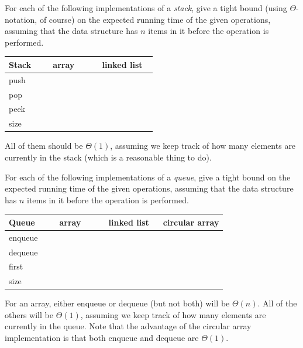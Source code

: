 \begin{exer}
For each of the following implementations of a {\em stack}, 
give a tight bound (using $\Theta$-notation, of course) 
on the expected running time of the given operations, 
assuming that the data structure has $n$ items in it before the operation is performed.

\noindent
{\LARGE
\begin{tabular}{|l|l|l|}
\hline
{\bf Stack}&\, \, \,  array\, \, \, &\, \, linked list\, \,\\
\hline
\hline
push&&\\
\hline
pop&&\\
\hline
peek&&\\
\hline
size&&\\
\hline
\end{tabular}
}
\begin{answer}
All of them should be $\Theta(1)$, assuming we keep track of how many elements
are currently in the stack (which is a reasonable thing to do).
\end{answer}
\end{exer}

\begin{exer}
For each of the following implementations of a {\em queue}, 
give a tight bound 
on the expected running time of the given operations, 
assuming that the data structure has $n$ items in it before the operation is performed.

\noindent
{\LARGE
\begin{tabular}{|l|l|l|l|}
\hline
{\bf Queue}&\, \, \,  array\, \, \, &\, \, linked list\, \, &circular array\\
\hline
\hline
enqueue&&&\\
\hline
dequeue&&&\\
\hline
first&&&\\
\hline
size&&&\\
\hline
\end{tabular}
}
\begin{answer}
For an array, either enqueue or dequeue (but not both) will be $\Theta(n)$.  
All of the others will be $\Theta(1)$, assuming we keep track of how many elements
are currently in the queue.  Note that the advantage of the circular array implementation
is that both enqueue and dequeue are $\Theta(1)$.
\end{answer}
\end{exer}


